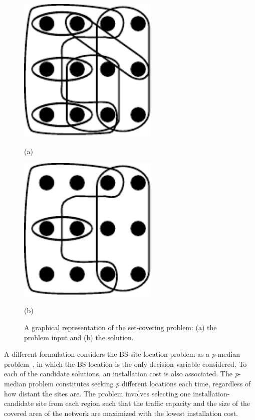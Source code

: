 \begin{figure}[H]
\centering

\begin{minipage}[c]{0.45\textwidth}%
\centering

\includegraphics[width=0.6\textwidth]{02-background_and_motivation/img/set_covering-IN}

(a)%
\end{minipage}\hfill{}%
\begin{minipage}[c]{0.45\textwidth}%
\centering

\includegraphics[width=0.6\textwidth]{02-background_and_motivation/img/set_covering-OUT}

(b)%
\end{minipage}\caption{A graphical representation of the set-covering problem: (a) the problem
input and (b) the solution.\label{fig:02-Minimum_set_covering_problem}}
\end{figure}


A different formulation considers the BS-site location problem as
a \emph{p}-median problem~\cite{Yang-UMTS_base_station_location_planning:2007},
in which the BS location is the only decision variable considered.
To each of the candidate solutions, an installation cost is also associated.
The \emph{p}-median problem constitutes seeking \emph{p} different
locations each time, regardless of how distant the sites are. The
problem involves selecting one installation-candidate site from each
region such that the traffic capacity and the size of the covered
area of the network are maximized with the lowest installation cost.


